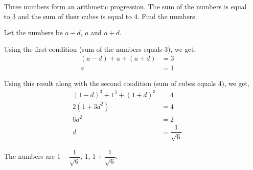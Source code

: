 
%
%
%
%
% 
% 

\question Three numbers form an arithmetic progression. The sum of the numbers is equal to 3 and the sum of their cubes is equal to 4. Find the numbers.

\insertQR{}

\ifprintanswers
\fi 

\begin{solution}
  Let the numbers be $a-d$, $a$ and $a+d$.
  
  Using the first condition (sum of the numbers equals 3), we get,
  \begin{align}
    (a-d) + a + (a+d) &= 3 \\
                             a &= 1
  \end{align}
  
  Using this result along with the second condition (sum of cubes equals 4), we get,
  \begin{align}
    (1-d)^3 + 1^3 + (1+d)^3 &= 4 \\
                         2(1 + 3d^2) &= 4 \\
                                    6d^2 &= 2 \\
                                          d &= \dfrac{1}{\sqrt{6}}
  \end{align}
  
  The numbers are $1-\dfrac{1}{\sqrt{6}}$, $1$, $1+\dfrac{1}{\sqrt{6}}$.
\end{solution}
